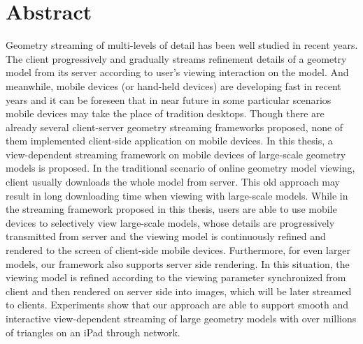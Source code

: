 \chapter*{Abstract}
\label{chapter:abstract}
Geometry streaming of multi-levels of detail has been well studied in recent years. The client progressively and gradually streams refinement details of a geometry model from its server according to user's viewing interaction on the model. And meanwhile, mobile devices (or hand-held devices) are developing fast in recent years and it can be foreseen that in near future in some particular scenarios mobile devices may take the place of tradition desktops. Though there are already several client-server geometry streaming frameworks proposed, none of them implemented client-side application on mobile devices. In this thesis, a view-dependent streaming framework on mobile devices of large-scale geometry models is proposed. In the traditional scenario of online geometry model viewing, client usually downloads the whole model from server. This old approach may result in long downloading time when viewing with large-scale models. While in the streaming framework proposed in this thesis, users are able to use mobile devices to selectively view large-scale models, whose details are progressively transmitted from server and the viewing model is continuously refined and rendered to the screen of client-side mobile devices. Furthermore, for even larger models, our framework also supports server side rendering. In this situation, the viewing model is refined according to the viewing parameter synchronized from client and then rendered on server side into images, which will be later streamed to clients. Experiments show that our approach are able to support smooth and interactive view-dependent streaming of large geometry models with over millions of triangles on an iPad through network. 

